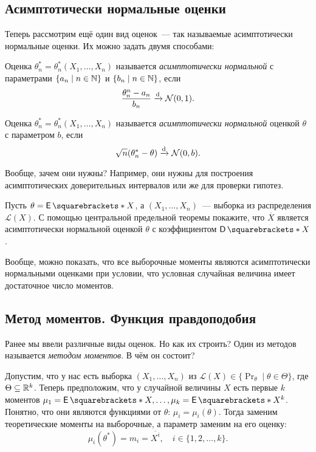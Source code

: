 \subsection{Асимптотически нормальные оценки}
Теперь рассмотрим ещё один вид оценок~--- так называемые асимптотически 
нормальные оценки. Их можно задать двумя способами:
\begin{definition}
	Оценка \(\theta^{*}_{n} = \theta^{*}_{n}(X_{1}, \dots, X_{n})\) называется 
	\emph{асимптотически нормальной} с параметрами \(\{a_{n} \mid n \in \mathbb{N}\}\) 
	и \(\{b_{n} \mid n \in \mathbb{N}\}\), если
	\[
		\frac{\theta^{n}_{n} - a_{n}}{b_{n}} \xrightarrow{\mathrm{d}} \mathcal{N}(0, 1).
	\]
\end{definition}
\begin{definition}
	Оценка \(\theta^{*}_{n} = \theta^{*}_{n}(X_{1}, \dots, X_{n})\) называется 
	\emph{асимптотически нормальной} оценкой \(\theta\) с параметром \(b\), если
	\[
		\sqrt{n}(\theta^{*}_{n} - \theta) \xrightarrow{\mathrm{d}} \mathcal{N}(0, b).
	\]
\end{definition}

Вообще, зачем они нужны? Например, они нужны для построения асимптотических 
доверительных интервалов или же для проверки гипотез. 
\begin{exercise}
	Пусть \(\theta = \E{X}\), а \((X_{1}, \dots, X_{n})\)~--- выборка из 
	распределения \(\mathcal{L}(X)\). С помощью центральной предельной теоремы 
	покажите, что \(\overline{X}\) является асимптотически нормальной оценкой 
	\(\theta\) с коэффициентом \(\D{X}\).
\end{exercise}

Вообще, можно показать, что все выборочные моменты являются асимптотически 
нормальными оценками при условии, что условная случайная величина имеет 
достаточное число моментов.

\subsection{Метод моментов. Функция правдоподобия}
Ранее мы ввели различные виды оценок. Но как их строить? Один из методов 
называется \emph{методом моментов}. В чём он состоит?

Допустим, что у нас есть выборка \((X_{1}, \dots, X_{n})\) из \(\mathcal{L}(X) 
\in \{\Pr_{\theta} \mid \theta \in \Theta\}\), где \(\Theta \subseteq \mathbb{R}^{k}\). 
Теперь предположим, что у 
случайной величины \(X\) есть первые \(k\) моментов \(\mu_{1} = \E{X}, \dots, 
\mu_{k} = \E{X^{k}}\). Понятно, что они являются функциями от \(\theta\): 
\(\mu_{i} = \mu_{i}(\theta)\). Тогда заменим теоретические моменты на 
выборочные, а параметр заменим на его оценку:
\[
	\mu_{i}(\theta^{*}) = m_{i} = \overline{X^{i}}, \quad i \in \{1, 2, \dots, 
	k\}.
\]

